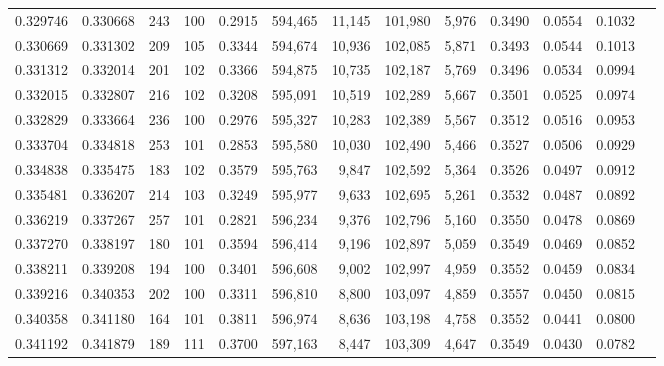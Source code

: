 \begin{tabular}{rrrrrrrrrrrrr}
0.329746 & 0.330668 &   243 & 100 &                                     0.2915 & 594,465 &  11,145 & 101,980 &   5,976 & 0.3490 & 0.0554 & 0.1032 \\
0.330669 & 0.331302 &   209 & 105 &                                     0.3344 & 594,674 &  10,936 & 102,085 &   5,871 & 0.3493 & 0.0544 & 0.1013 \\
0.331312 & 0.332014 &   201 & 102 &                                     0.3366 & 594,875 &  10,735 & 102,187 &   5,769 & 0.3496 & 0.0534 & 0.0994 \\
0.332015 & 0.332807 &   216 & 102 &                                     0.3208 & 595,091 &  10,519 & 102,289 &   5,667 & 0.3501 & 0.0525 & 0.0974 \\
0.332829 & 0.333664 &   236 & 100 &                                     0.2976 & 595,327 &  10,283 & 102,389 &   5,567 & 0.3512 & 0.0516 & 0.0953 \\
0.333704 & 0.334818 &   253 & 101 &                                     0.2853 & 595,580 &  10,030 & 102,490 &   5,466 & 0.3527 & 0.0506 & 0.0929 \\
0.334838 & 0.335475 &   183 & 102 &                                     0.3579 & 595,763 &   9,847 & 102,592 &   5,364 & 0.3526 & 0.0497 & 0.0912 \\
0.335481 & 0.336207 &   214 & 103 &                                     0.3249 & 595,977 &   9,633 & 102,695 &   5,261 & 0.3532 & 0.0487 & 0.0892 \\
0.336219 & 0.337267 &   257 & 101 &                                     0.2821 & 596,234 &   9,376 & 102,796 &   5,160 & 0.3550 & 0.0478 & 0.0869 \\
0.337270 & 0.338197 &   180 & 101 &                                     0.3594 & 596,414 &   9,196 & 102,897 &   5,059 & 0.3549 & 0.0469 & 0.0852 \\
0.338211 & 0.339208 &   194 & 100 &                                     0.3401 & 596,608 &   9,002 & 102,997 &   4,959 & 0.3552 & 0.0459 & 0.0834 \\
0.339216 & 0.340353 &   202 & 100 &                                     0.3311 & 596,810 &   8,800 & 103,097 &   4,859 & 0.3557 & 0.0450 & 0.0815 \\
0.340358 & 0.341180 &   164 & 101 &                                     0.3811 & 596,974 &   8,636 & 103,198 &   4,758 & 0.3552 & 0.0441 & 0.0800 \\
0.341192 & 0.341879 &   189 & 111 &                                     0.3700 & 597,163 &   8,447 & 103,309 &   4,647 & 0.3549 & 0.0430 & 0.0782 \\

\end{tabular}
